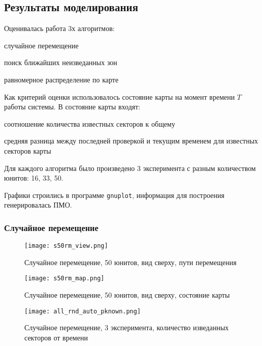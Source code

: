 \subsection{Результаты моделирования}

Оценивалась работа 3х алгоритмов:
\begin{mintemize}
\item случайное перемещение
\item поиск ближайших неизведанных зон
\item равномерное распределение по карте
\end{mintemize}

Как критерий оценки использовалось состояние карты на момент
времени $T$ работы системы. В состояние карты входят:

\begin{mintemize}
\item соотношение количества известных секторов к общему
\item средняя разница между последней проверкой и текущим временем
    для известных секторов карты
\end{mintemize}

Для каждого алгоритма было произведено 3 эксперимента с разным
количеством юнитов: 16, 33, 50.

Графики строились в программе \verb|gnuplot|, информация для
построения генерировалась ПМО.

\newpage
\subsubsection{Случайное перемещение}

\begin{figure}[h!]
    \centering
    \texttt{[image: s50rm\_view.png]}
    \caption{Случайное перемещение, 50 юнитов, вид сверху, пути перемещения}
\end{figure}

\begin{figure}[h!]
    \centering
    \texttt{[image: s50rm\_map.png]}
    \caption{Случайное перемещение, 50 юнитов, вид сверху, состояние карты}
\end{figure}

\begin{figure}[h!]
    \centering
    \texttt{[image: all\_rnd\_auto\_pknown.png]}
    \caption{Случайное перемещение, 3 эксперимента, количество изведанных секторов от времени}
\end{figure}

